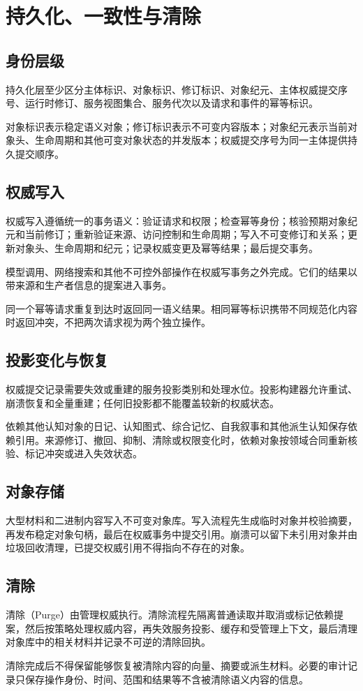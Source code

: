 \chapter{持久化、一致性与清除}

\section{身份层级}

持久化层至少区分主体标识、对象标识、修订标识、对象纪元、主体权威提交序号、运行时修订、服务视图集合、服务代次以及请求和事件的幂等标识。

对象标识表示稳定语义对象；修订标识表示不可变内容版本；对象纪元表示当前对象头、生命周期和其他可变对象状态的并发版本；权威提交序号为同一主体提供持久提交顺序。

\section{权威写入}

权威写入遵循统一的事务语义：验证请求和权限；检查幂等身份；核验预期对象纪元和当前修订；重新验证来源、访问控制和生命周期；写入不可变修订和关系；更新对象头、生命周期和纪元；记录权威变更及幂等结果；最后提交事务。

模型调用、网络搜索和其他不可控外部操作在权威写事务之外完成。它们的结果以带来源和生产者信息的提案进入事务。

同一个幂等请求重复到达时返回同一语义结果。相同幂等标识携带不同规范化内容时返回冲突，不把两次请求视为两个独立操作。

\section{投影变化与恢复}

权威提交记录需要失效或重建的服务投影类别和处理水位。投影构建器允许重试、崩溃恢复和全量重建；任何旧投影都不能覆盖较新的权威状态。

依赖其他认知对象的日记、认知图式、综合记忆、自我叙事和其他派生认知保存依赖引用。来源修订、撤回、抑制、清除或权限变化时，依赖对象按领域合同重新核验、标记冲突或进入失效状态。

\section{对象存储}

大型材料和二进制内容写入不可变对象库。写入流程先生成临时对象并校验摘要，再发布稳定对象句柄，最后在权威事务中提交引用。崩溃可以留下未引用对象并由垃圾回收清理，已提交权威引用不得指向不存在的对象。

\section{清除}

清除（Purge）由管理权威执行。清除流程先隔离普通读取并取消或标记依赖提案，然后按策略处理权威内容，再失效服务投影、缓存和受管理上下文，最后清理对象库中的相关材料并记录不可逆的清除回执。

清除完成后不得保留能够恢复被清除内容的向量、摘要或派生材料。必要的审计记录只保存操作身份、时间、范围和结果等不含被清除语义内容的信息。
